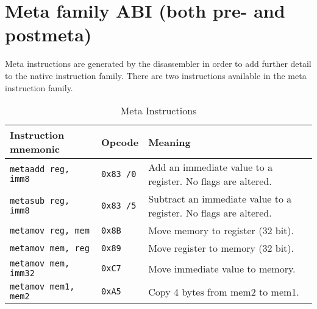 \documentclass[12pt]{report}
\begin{document}
\section{Meta family ABI (both pre- and postmeta)}
\label{sec:meta-family-abi}
Meta instructions are generated by the disassembler in order to add further detail to the native instruction family. There are two instructions available in the meta instruction family.\\
\begin{table}[H]
	\begin{tabular}{| l | l | l |}
		\hline
		\textbf{Instruction mnemonic} & \textbf{Opcode}  & \textbf{Meaning}\\ \hline
		\texttt{metaadd reg, imm8}	  & \texttt{0x83 /0} & Add an immediate value to a register. No flags are altered.\\ \hline
		\texttt{metasub reg, imm8} 	  & \texttt{0x83 /5} & Subtract an immediate value to a register. No flags are altered.\\ \hline
		\texttt{metamov reg, mem}	  & \texttt{0x8B}	 & Move memory to register (32 bit).\\ \hline
		\texttt{metamov mem, reg}	  & \texttt{0x89}    & Move register to memory (32 bit).\\ \hline
		\texttt{metamov mem, imm32}	  & \texttt{0xC7}    & Move immediate value to memory.\\ \hline
		\texttt{metamov mem1, mem2}	  & \texttt{0xA5}    & Copy 4 bytes from mem2 to mem1.\\ \hline
	\end{tabular}
	\caption{Meta Instructions}
\end{table}
\end{document}
